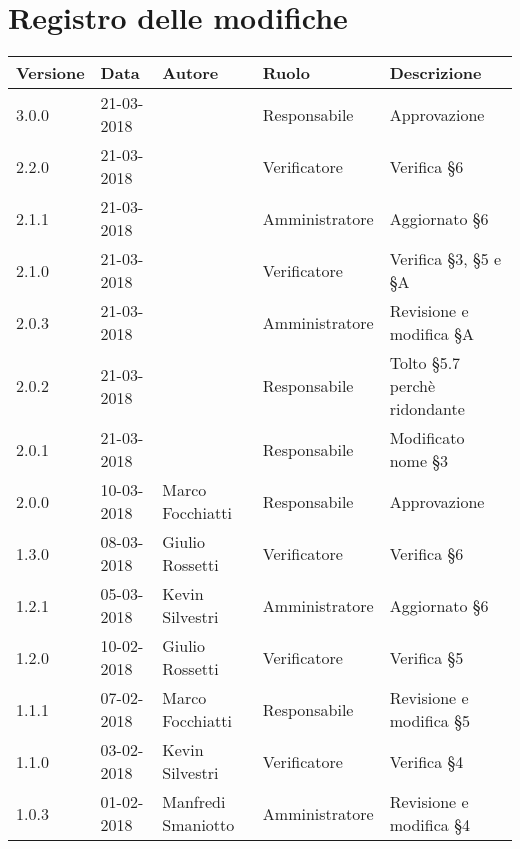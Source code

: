 \documentclass[./PianodiProgetto.tex]{subfiles}
\begin{document}
\chapter*{Registro delle modifiche}
\setlength\LTleft{-22mm}
\begin{longtable}{|p{20mm}|p{20mm}|p{40mm}|p{30mm}|p{50mm}|}
	\hline
	\textbf{Versione} & \textbf{Data} & \textbf{Autore} & \textbf{Ruolo} & \textbf{Descrizione} \\ 
	
		\hline 3.0.0 & 21-03-2018 &  & Responsabile & Approvazione \\
	
		\hline 2.2.0 & 21-03-2018 &  & Verificatore & Verifica §6 \\
	
		\hline 2.1.1 & 21-03-2018 &  & Amministratore & Aggiornato §6 \\ 
		
		\hline 2.1.0 & 21-03-2018 &  & Verificatore & Verifica §3, §5 e §A  \\
	
		\hline 2.0.3 & 21-03-2018 &  & Amministratore & Revisione e modifica §A \\
		
		\hline 2.0.2 & 21-03-2018 &  & Responsabile & Tolto §5.7 perchè ridondante \\
	
		\hline 2.0.1 & 21-03-2018 &  & Responsabile & Modificato nome §3 \\
	
		\hline 2.0.0 & 10-03-2018 & Marco Focchiatti & Responsabile & Approvazione \\
		
		\hline 1.3.0 & 08-03-2018 & Giulio Rossetti & Verificatore & Verifica §6 \\
		
		\hline 1.2.1 & 05-03-2018 & Kevin Silvestri & Amministratore & Aggiornato §6 \\
		
		\hline 1.2.0 & 10-02-2018 & Giulio Rossetti & Verificatore & Verifica §5 \\
		
		\hline 1.1.1 & 07-02-2018 & Marco Focchiatti & Responsabile & Revisione e modifica §5 \\
		
		\hline 1.1.0 & 03-02-2018 & Kevin Silvestri & Verificatore & Verifica §4 \\
				
		\hline 1.0.3 & 01-02-2018 & Manfredi Smaniotto & Amministratore & Revisione e modifica §4 \\
		

\end{longtable}
\end{document}
